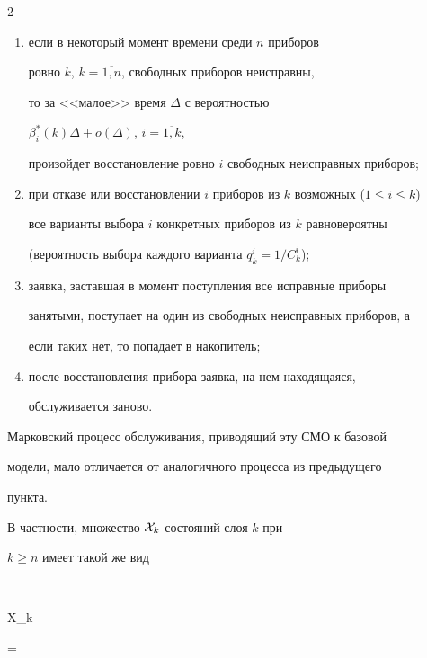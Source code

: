 \begin{multicols}{2}
\begin{enumerate}[(1)]
$\alpha^*_i(k)\Delta+o(\Delta)$, $i=\overline{1,k}$,


произойдет отказ ровно $i$ свободных приборов;


\item


если в некоторый момент времени среди $n$ приборов


ровно $k$, $k=\overline{1,n}$, свободных приборов неисправны,


то за <<малое>> время $\Delta$ с вероятностью


$\beta^*_i(k)\Delta+o(\Delta)$, $i=\overline{1,k}$,


произойдет восстановление ровно $i$ свободных неисправных приборов;


\item


при отказе или восстановлении $i$ приборов из $k$ возможных ($1\le i\le k$)


все варианты выбора $i$ конкретных приборов из $k$ равновероятны


(вероятность выбора каждого варианта $q^i_k=1/C^i_k$);


\item


заявка, заставшая в момент поступления все исправные приборы


занятыми, поступает на один из свободных неисправных приборов, а


если таких нет, то попадает в накопитель;


\item


после восстановления прибора заявка, на нем находящаяся,


обслуживается заново.


\end{enumerate}





Марковский процесс обслуживания, приводящий эту СМО к базовой


модели, мало отличается от аналогичного процесса из предыдущего


пункта.





В частности, множество ${\cal X}_k$ состояний слоя $k$ при


$k\ge n$ имеет такой же вид


$$


{\cal X}_k


=



\end{multicols}

